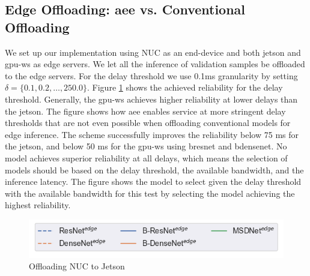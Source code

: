 \subsection{Edge Offloading: \gls{aee} vs. Conventional Offloading}

We set up our implementation using NUC as an end-device and both \gls{jetson} and \gls{gpu-ws} as edge servers. We let all the inference of validation samples be offloaded to the edge servers. For the delay threshold we use 0.1ms granularity by setting $\delta = \{0.1,0.2, \dots, 250.0\}$. Figure \ref{fig:practical-offloading} shows the achieved reliability for the delay threshold. Generally, the \gls{gpu-ws} achieves higher reliability at lower delays than the \gls{jetson}. The figure shows how \gls{aee} enables service at more stringent delay thresholds that are not even possible when offloading conventional models for edge inference. The scheme successfully improves the reliability below 75 ms for the \gls{jetson}, and below 50 ms for the \gls{gpu-ws} using \gls{bresnet} and \gls{bdensenet}. 
No model achieves superior reliability at all delays, which means the selection of models should be based on the delay threshold, the available bandwidth, and the inference latency. The figure shows the model to select given the delay threshold with the available bandwidth for this test by selecting the model achieving the highest reliability.
\begin{figure}
	\captionsetup[subfigure]{justification=centering,farskip=1pt,captionskip=1pt}
	\centering
	\includegraphics[width=.5\linewidth]{figures/edge/offloading_legend}
	\hfill
	\caption[Offloading NUC to Jetson]{Offloading NUC to Jetson}
	\label{fig:practical-offloading}
\end{figure}

